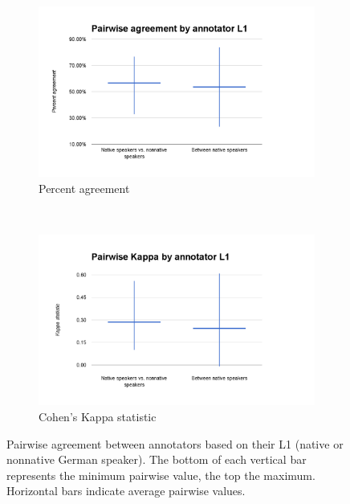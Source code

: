 		\begin{figure}[htb]
			\centering
			
			\begin{subfigure}[b]{.5\textwidth}
				\centering
				\includegraphics[width=\textwidth]{img/annotation/pairAgreeL1}
				\caption{Percent agreement}
				\label{fig:agreement:L1:pct}
			\end{subfigure}%
			~
			\begin{subfigure}[b]{.5\textwidth}
				\centering
				\includegraphics[width=\textwidth]{img/annotation/pairKappaL1}
				\caption{Cohen's Kappa statistic}
				\label{fig:agreement:L1:k}
			\end{subfigure}%
			
			\caption[Pairwise agreement statistics by annotator L1 group]{Pairwise agreement between annotators based on their L1  (native or nonnative German speaker). The bottom of each vertical bar represents the minimum pairwise value, the top the maximum. Horizontal bars indicate average pairwise values.}
			\label{fig:agreement:L1}
		\end{figure}
		
